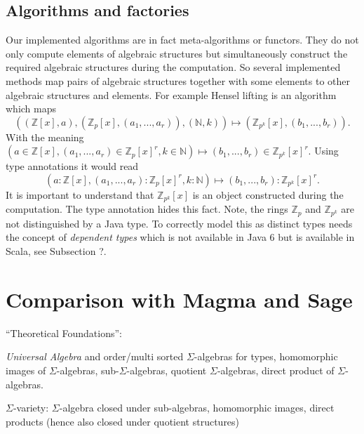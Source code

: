 \documentclass{llncs}
\begin{document}
\subsection{Algorithms and factories} %
\label{sec:anf}

Our implemented algorithms are in fact meta-algorithms or functors.
They do not only compute elements of algebraic structures but
simultaneously construct the required algebraic structures during
the computation.  So several implemented methods map pairs of
algebraic structures together with some elements to other algebraic
structures and elements. For example Hensel lifting is an algorithm
which maps
$$
  ((\mathbb{Z}[x],a),(\mathbb{Z}_{p}[x],(a_1,...,a_r)),(\mathbb{N},k)) 
  \mapsto 
  (\mathbb{Z}_{p^k}[x],(b_1,...,b_r)).  
$$
With the meaning
$
  (a \in \mathbb{Z}[x],(a_1,...,a_r) \in \mathbb{Z}_{p}[x]^r,k \in \mathbb{N}) 
  \mapsto 
  (b_1,...,b_r) \in \mathbb{Z}_{p^k}[x]^r.  
$
Using type annotations it would read
$$
  (a : \mathbb{Z}[x], (a_1,...,a_r): \mathbb{Z}_{p}[x]^r, k: \mathbb{N}) 
  \mapsto 
  (b_1,...,b_r) : \mathbb{Z}_{p^k}[x]^r.  
$$
It is important to understand that $\mathbb{Z}_{p^k}[x]$ is an object
constructed during the computation.  The type annotation hides this
fact.  
Note, the rings $\mathbb{Z}_{p}$ and $\mathbb{Z}_{p^k}$ are not
distinguished by a Java type. To correctly model this as distinct
types needs the concept of {\em dependent types} which is not
available in Java 6 but is available in Scala, see Subsection
?. %




\section{Comparison with Magma and Sage} %
\label{sec:magma}

``Theoretical Foundations'':

{\em Universal Algebra} and order/multi sorted $\Sigma$-algebras for types,
homomorphic images of $\Sigma$-algebras, sub-$\Sigma$-algebras,
quotient $\Sigma$-algebras, direct product of $\Sigma$-algebras.

$\Sigma$-variety: $\Sigma$-algebra closed under sub-algebras,
homomorphic images, direct products (hence also closed under quotient
structures)
\end{document}
